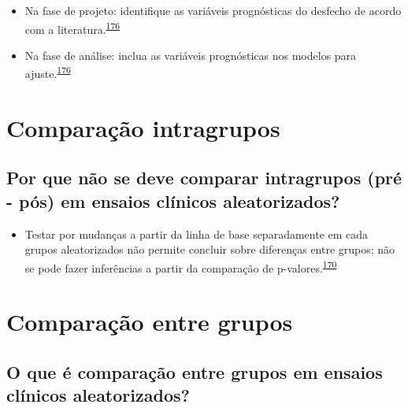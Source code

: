 \documentclass[
  a4paper,
]{book}
\providecommand{\tightlist}{%
  \setlength{\itemsep}{0pt}\setlength{\parskip}{0pt}}
\begin{document}
\begin{itemize}
\item
  Na fase de projeto: identifique as variáveis prognósticas do desfecho de acordo com a literatura.\textsuperscript{\protect\hyperlink{ref-roberts1999}{176}}
\item
  Na fase de análise: inclua as variáveis prognósticas nos modelos para ajuste.\textsuperscript{\protect\hyperlink{ref-roberts1999}{176}}
\end{itemize}

\hypertarget{comparacao-intragrupos}{%
\section{Comparação intragrupos}\label{comparacao-intragrupos}}

\hypertarget{por-que-nuxe3o-se-deve-comparar-intragrupos-pruxe9---puxf3s-em-ensaios-cluxednicos-aleatorizados}{%
\subsection{Por que não se deve comparar intragrupos (pré - pós) em ensaios clínicos aleatorizados?}\label{por-que-nuxe3o-se-deve-comparar-intragrupos-pruxe9---puxf3s-em-ensaios-cluxednicos-aleatorizados}}

\begin{itemize}
\tightlist
\item
  Testar por mudanças a partir da linha de base separadamente em cada grupos aleatorizados não permite concluir sobre diferenças entre grupos; não se pode fazer inferências a partir da comparação de p-valores.\textsuperscript{\protect\hyperlink{ref-bland2011}{170}}
\end{itemize}

\hypertarget{comparacao-entre-grupos}{%
\section{Comparação entre grupos}\label{comparacao-entre-grupos}}

\hypertarget{o-que-uxe9-comparauxe7uxe3o-entre-grupos-em-ensaios-cluxednicos-aleatorizados}{%
\subsection{O que é comparação entre grupos em ensaios clínicos aleatorizados?}\label{o-que-uxe9-comparauxe7uxe3o-entre-grupos-em-ensaios-cluxednicos-aleatorizados}}
\end{document}
